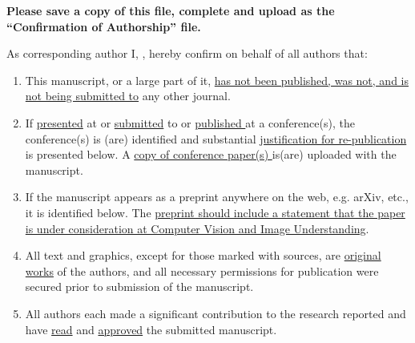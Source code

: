 \documentclass[times,sort&compress]{elsarticle}
\begin{document}
\thispagestyle{empty}
                                                             
\begin{table}[!th]

\begin{minipage}{.9\textwidth}
\baselineskip12pt
\ifpreprint
  \vspace*{1pc}
\else
  \vspace*{-6pc}
\fi

\vskip6pt


\vskip1pc


{\bf Please save a copy of this file, complete and upload as the ``Confirmation of
Authorship'' file.}

\vskip1pc

As corresponding author I, \underline{\hphantom{\hspace*{7cm}}}, hereby confirm on
behalf of all authors that:

\vskip1pc

\begin{enumerate}
\itemsep=3pt
\item This manuscript, or a large part of it, \underline {has not been published,  was
not, and is not being submitted to} any other journal. 

\item If \underline {presented} at or \underline {submitted} to or \underline {published
}at a conference(s), the conference(s) is (are) identified and  substantial \underline
{justification for re-publication} is presented  below. A \underline {copy of conference
paper(s) }is(are) uploaded with the  manuscript.

\item If the manuscript appears as a preprint anywhere on the web, e.g. arXiv,  etc., it
is identified below. The \underline {preprint should include a  statement that the paper
is under consideration at Computer Vision and Image Understanding}.

\item All text and graphics, except for those marked with sources, are \underline
{original works} of the authors, and all necessary permissions for  publication were
secured prior to submission of the manuscript.

\item All authors each made a significant contribution to the research reported  and
have \underline {read} and \underline {approved} the submitted  manuscript. 
\end{enumerate}


\end{minipage}
\end{table}
\end{document}
